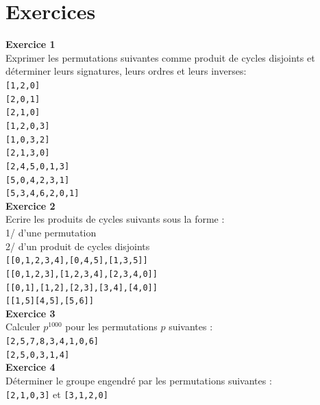 \documentclass[a4paper,11pt]{book}
\begin{document}
\section{Exercices} \label{sec:exoperm}

{\bf Exercice 1}\\
Exprimer les permutations suivantes comme produit de cycles disjoints et 
d\'eterminer leurs signatures, leurs ordres  et leurs inverses:\\
{\tt [1,2,0]}\\
{\tt [2,0,1]}\\
{\tt [2,1,0]}\\
{\tt [1,2,0,3]}\\
{\tt [1,0,3,2]}\\
{\tt [2,1,3,0]}\\
{\tt [2,4,5,0,1,3]}\\
{\tt [5,0,4,2,3,1]}\\
{\tt [5,3,4,6,2,0,1]}\\

{\bf Exercice 2}\\
Ecrire les produits de cycles suivants sous la forme :\\
1/ d'une permutation\\
2/ d'un produit de cycles disjoints\\
{\tt [[0,1,2,3,4],[0,4,5],[1,3,5]]}\\
{\tt [[0,1,2,3],[1,2,3,4],[2,3,4,0]]}\\
{\tt [[0,1],[1,2],[2,3],[3,4],[4,0]]}\\
{\tt [[1,5][4,5],[5,6]]}\\

{\bf Exercice 3}\\
Calculer $p^{1000}$ pour les permutations $p$ suivantes :\\
{\tt [2,5,7,8,3,4,1,0,6]}\\
{\tt [2,5,0,3,1,4]}\\

{\bf Exercice 4}\\
D\'eterminer le groupe engendr\'e par les permutations suivantes :\\
{\tt [2,1,0,3]} et {\tt [3,1,2,0]}
\end{document}
